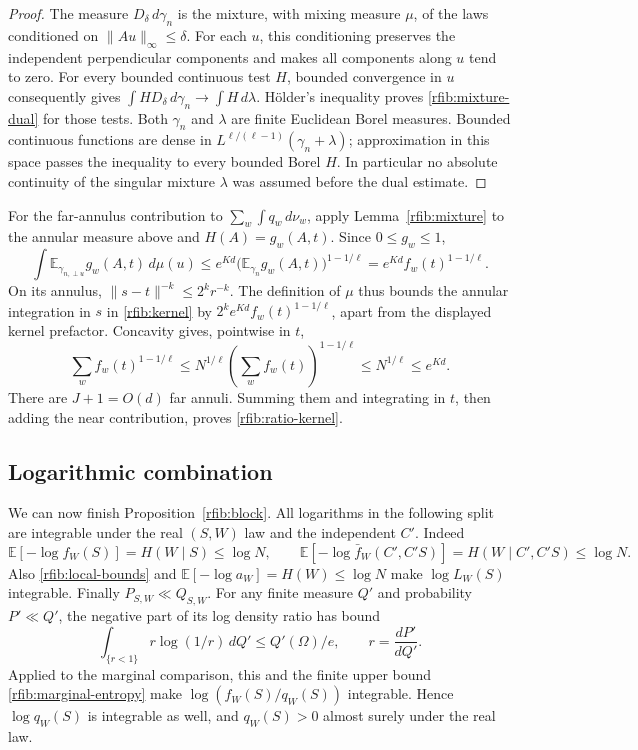 \begin{proof}
The measure \(D_\delta\,d\gamma_n\) is the mixture, with mixing
measure \(\mu\), of the laws conditioned on
\(\|Au\|_\infty\le\delta\).  For each \(u\), this conditioning
preserves the independent perpendicular components and makes all
components along \(u\) tend to zero.  For every bounded continuous
test \(H\), bounded convergence in \(u\) consequently gives
\(\int H D_\delta\,d\gamma_n\longrightarrow\int H\,d\lambda\).
Hölder's inequality proves \eqref{rfib:mixture-dual} for those tests.
Both \(\gamma_n\) and \(\lambda\) are finite Euclidean Borel
measures.  Bounded continuous functions are dense in
\(L^{\ell/(\ell-1)}(\gamma_n+\lambda)\); approximation in this
space passes the inequality to every bounded Borel \(H\).
In particular no absolute continuity of the singular mixture
\(\lambda\) was assumed before the dual estimate.
\end{proof}

For the far-annulus contribution to \(\sum_w\int q_w\,d\nu_w\),
apply Lemma~\ref{rfib:mixture} to the annular measure above and
\(H(A)=g_w(A,t)\).  Since \(0\le g_w\le1\),
\[
 \int\mathbb E_{\gamma_{n,\perp u}}g_w(A,t)\,d\mu(u)
 \le e^{Kd}\bigl(\mathbb E_{\gamma_n}g_w(A,t)\bigr)^{1-1/\ell}
 =e^{Kd}f_w(t)^{1-1/\ell}.
\]
On its annulus, \(\|s-t\|^{-k}\le2^kr^{-k}\).
The definition of \(\mu\) thus bounds the annular integration in
\(s\) in \eqref{rfib:kernel} by \(2^ke^{Kd}f_w(t)^{1-1/\ell}\),
apart from the displayed kernel prefactor.  Concavity gives, pointwise
in \(t\),
\[
 \sum_w f_w(t)^{1-1/\ell}
 \le N^{1/\ell}\left(\sum_wf_w(t)\right)^{1-1/\ell}
 \le N^{1/\ell}\le e^{Kd}.
\]
There are \(J+1=O(d)\) far annuli.  Summing them and integrating in
\(t\), then adding the near contribution, proves
\eqref{rfib:ratio-kernel}.

\subsection{Logarithmic combination}

We can now finish Proposition~\ref{rfib:block}.  All logarithms in the
following split are integrable under the real \((S,W)\) law and the
independent \(C'\).  Indeed
\[
 \mathbb E[-\log f_W(S)]=H(W\mid S)\le\log N,\qquad
 \mathbb E[-\log\bar f_W(C',C'S)]=H(W\mid C',C'S)\le\log N.
\]
Also \eqref{rfib:local-bounds} and
\(\mathbb E[-\log a_W]=H(W)\le\log N\) make \(\log L_W(S)\)
integrable.  Finally \(P_{S,W}\ll Q_{S,W}\).  For any finite
measure \(Q'\) and probability \(P'\ll Q'\), the negative part of
its log density ratio has bound
\[
 \int_{\{r<1\}}r\log(1/r)\,dQ'\le Q'(\Omega)/e,
 \qquad r=\frac{dP'}{dQ'}.
\]
Applied to the marginal comparison, this and the finite upper bound
\eqref{rfib:marginal-entropy} make
\(\log(f_W(S)/q_W(S))\) integrable.  Hence \(\log q_W(S)\) is
integrable as well, and \(q_W(S)>0\) almost surely under the real law.

